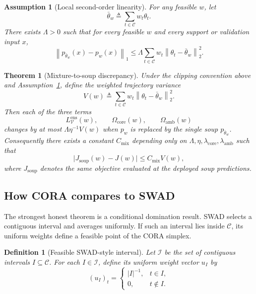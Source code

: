 \documentclass{article}
\newtheorem{theorem}{Theorem}
\newtheorem{definition}{Definition}
\newtheorem{assumption}{Assumption}
\newcommand{\cC}{\mathcal{C}}
\newcommand{\cV}{\mathcal{V}}
\newcommand{\cI}{\mathcal{I}}
\newcommand{\cora}{\textup{\textsc{CORA}}}
\newcommand{\swad}{\textup{\textsc{SWAD}}}
\newcommand{\norm}[1]{\left\lVert #1 \right\rVert}
\begin{document}
\begin{assumption}[Local second-order linearity]
\label{ass:locality}
For any feasible $w$, let
\[
    \bar\theta_w \triangleq \sum_{t\in\cC} w_t \theta_t.
\]
There exists $\Lambda > 0$ such that for every feasible $w$ and every support or validation input $x$,
\begin{equation}
    \norm{
        p_{\bar\theta_w}(x) - p_w(x)
    }_1
    \le
    \Lambda
    \sum_{t\in\cC}
    w_t
    \norm{\theta_t-\bar\theta_w}_2^2.
    \label{eq:locality_assump}
\end{equation}
\end{assumption}

\begin{theorem}[Mixture-to-soup discrepancy]
\label{thm:mixture_to_soup}
Under the clipping convention above and Assumption~\ref{ass:locality}, define the weighted trajectory variance
\[
    V(w)
    \triangleq
    \sum_{t\in\cC} w_t \norm{\theta_t-\bar\theta_w}_2^2.
\]
Then each of the three terms
\[
    L_{\cV}^{\mathrm{ens}}(w),
    \qquad
    \Omega_{\mathrm{core}}(w),
    \qquad
    \Omega_{\mathrm{amb}}(w)
\]
changes by at most $\Lambda \eta^{-1} V(w)$ when $p_w$ is replaced by the single soup $p_{\bar\theta_w}$. Consequently there exists a constant $C_{\mathrm{mix}}$ depending only on $\Lambda,\eta,\lambda_{\mathrm{core}},\lambda_{\mathrm{amb}}$ such that
\begin{equation}
    \big|J_{\mathrm{soup}}(w)-J(w)\big|
    \le
    C_{\mathrm{mix}} V(w),
    \label{eq:soup_gap}
\end{equation}
where $J_{\mathrm{soup}}$ denotes the same objective evaluated at the deployed soup predictions.
\end{theorem}

\subsection{How \cora{} compares to \swad}

The strongest honest theorem is a conditional domination result. \swad{} selects a contiguous interval and averages uniformly. If such an interval lies inside $\cC$, its uniform weights define a feasible point of the \cora{} simplex.

\begin{definition}[Feasible \swad-style interval]
Let $\cI$ be the set of contiguous intervals $I\subseteq\cC$. For each $I\in\cI$, define its uniform weight vector $u_I$ by
\[
    (u_I)_t
    =
    \begin{cases}
        |I|^{-1}, & t\in I,\\
        0, & t\notin I.
    \end{cases}
\]
\end{definition}
\end{document}
